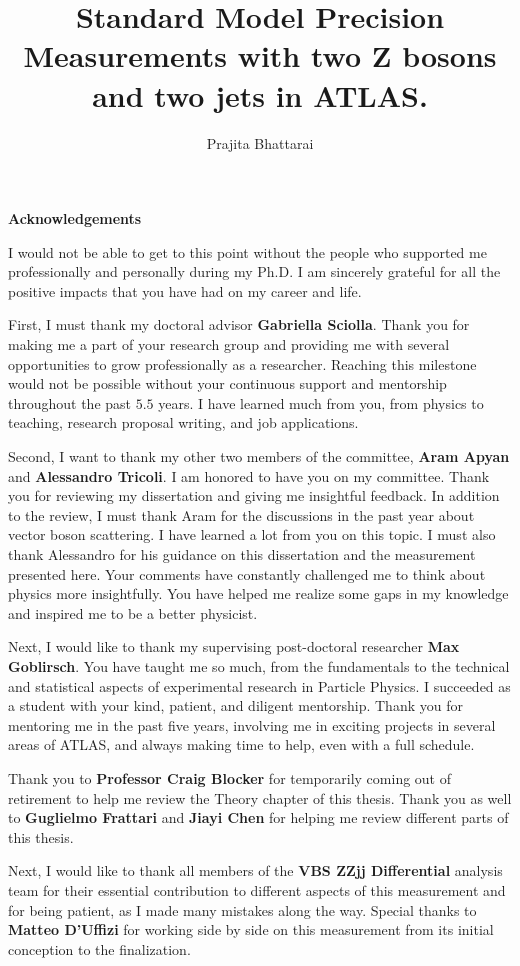 \documentclass[red]{brandeis-dissertation}
\title{Standard Model Precision Measurements with two Z bosons and two jets in ATLAS.}
\author{Prajita Bhattarai}
\numberwithin{equation}{section}
\begin{document}
\maketitlepage
\clearpage
\makeapproval
\clearpage
\makecopyright
\clearpage
\begin{center}
\textbf{\large{Acknowledgements}}
\end{center}
I would not be able to get to this point without the people who supported me professionally and personally during my Ph.D. I am sincerely grateful for all the positive impacts that you have had on my career and life.

First, I must thank my doctoral advisor \textbf{Gabriella Sciolla}. Thank you for making me a part of your research group and providing me with several opportunities to grow professionally as a researcher. Reaching this milestone would not be possible without your continuous support and mentorship throughout the past $5.5$ years. I have learned much from you, from physics to teaching, research proposal writing, and job applications. 

Second, I want to thank my other two members of the committee, \textbf{Aram Apyan} and 
\textbf{Alessandro Tricoli}. I am honored to have you on my committee. Thank you for reviewing my dissertation and giving me insightful feedback. In addition to the review, I must thank Aram for the discussions in the past year about vector boson scattering. I have learned a lot from you on this topic. I must also thank Alessandro for his guidance on this dissertation and the measurement presented here. Your comments have constantly challenged me to think about physics more insightfully. You have helped me realize some gaps in my knowledge and inspired me to be a better physicist.

Next, I would like to thank my supervising post-doctoral researcher \textbf{Max Goblirsch}. You have taught me so much, from the fundamentals to the technical and statistical aspects of experimental research in Particle Physics. I succeeded as a student with your kind, patient, and diligent mentorship. Thank you for mentoring me in the past five years, involving me in exciting projects in several areas of ATLAS, and always making time to help, even with a full schedule. 

Thank you to \textbf{Professor Craig Blocker} for temporarily coming out of retirement to help me review the Theory chapter of this thesis. Thank you as well to \textbf{Guglielmo Frattari} and \textbf{Jiayi Chen} for helping me review different parts of this thesis. 

Next, I would like to thank all members of the \textbf{VBS ZZjj Differential} analysis team for their essential contribution to different aspects of this measurement and for being patient, as I made many mistakes along the way. Special thanks to \textbf{Matteo D'Uffizi} for working side by side on this measurement from its initial conception to the finalization.
\end{document}
